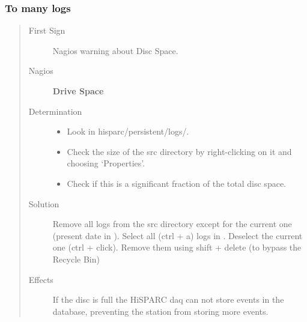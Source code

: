 \documentclass[a4paper,11pt,english]{sphinxmanual}
\begin{document}
\subsubsection{To many logs}
\label{known-issues:to-many-logs}\begin{quote}\begin{description}
\item[{First Sign}] \leavevmode
Nagios warning about Disc Space.

\item[{Nagios}] \leavevmode
\textbf{Drive Space}

\item[{Determination}] \leavevmode\begin{itemize}
\item {} 
Look in hisparc/persistent/logs/.

\item {} 
Check the size of the src directory by right-clicking on it and choosing `Properties'.

\item {} 
Check if this is a significant fraction of the total disc space.

\end{itemize}

\item[{Solution}] \leavevmode
Remove all logs from the src directory except for the current one (present date in ). Select all (ctrl + a) logs in . Deselect the current one (ctrl + click). Remove them using shift + delete (to bypass the Recycle Bin)

\item[{Effects}] \leavevmode
If the disc is full the HiSPARC daq can not store events in the database, preventing the station from storing more events.

\end{description}\end{quote}
\end{document}
